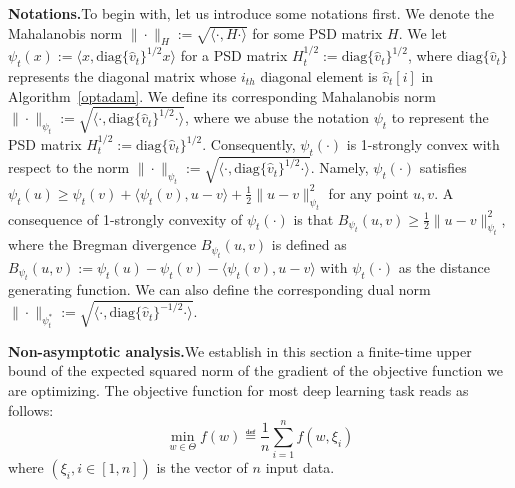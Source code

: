 \documentclass[11pt]{article}
\theoremstyle{k}
\begin{document}
\textbf{Notations.}\hspace{0.1in}To begin with, let us introduce some notations first.
We denote the Mahalanobis norm $\|\cdot\|_H := \sqrt{ \langle \cdot, H \cdot \rangle }$ for some PSD matrix $H$.
We let $\psi_t(x) := \langle x, \text{diag}\{\hat{v}_t\}^{1/2} x \rangle$ for a PSD matrix $H_t^{1/2}:= \text{diag}\{\hat{v}_t\}^{1/2}$, 
where $\text{diag}\{\hat{v}_t\}$ represents the diagonal matrix whose $i_{th}$ diagonal element is $\hat{v}_t[i]$ in Algorithm~\ref{optadam}.
We define its corresponding Mahalanobis norm $\| \cdot \|_{\psi_t}:= 
\sqrt{ \langle \cdot, \text{diag}\{\hat{v}_t\}^{1/2} \cdot \rangle }$,
where we abuse the notation $\psi_t$ to represent the PSD matrix $H_t^{1/2}:=\text{diag}\{\hat{v}_t\}^{1/2}$.
Consequently,
$\psi_t(\cdot)$ is 1-strongly convex with respect to the norm $\| \cdot \|_{\psi_t}:= 
\sqrt{ \langle \cdot, \text{diag}\{\hat{v}_t\}^{1/2} \cdot \rangle }$.
Namely, $\psi_t(\cdot)$ satisfies
$\psi_t(u) \geq \psi_t(v) + \langle \psi_t(v), u - v \rangle + \frac{1}{2} \| u - v\|^2_{\psi_t}$
for any point $u,v$.
A consequence of 1-strongly convexity of $\psi_t(\cdot)$ is that
$B_{\psi_t}(u,v) \geq \frac{1}{2} \| u - v \|^2_{\psi_t}$,
where the Bregman divergence $B_{\psi_t}(u,v)$ is defined as 
$B_{\psi_t}(u,v) := \psi_t(u)
- \psi_t(v) - \langle \psi_t(v), u - v \rangle
$ with $\psi_t(\cdot)$ as the distance generating function.
We can also define the corresponding dual norm $\| \cdot \|_{\psi_t^*}:= \sqrt{ \langle \cdot, \text{diag}\{\hat{v}_t\}^{-1/2} \cdot \rangle }$.

\textbf{Non-asymptotic analysis.}\hspace{0.1in}We establish in this section a finite-time upper bound of the expected squared norm of the gradient of the objective function we are optimizing.
The objective function for most deep learning task reads as follows:
\begin{equation}\label{eq:minproblem}
\min \limits_{w \in \Theta} f(w) \eqdef  \frac{1}{n} \sum_{i=1}^n f(w, \xi_i)
\end{equation}
where $(\xi_i, i \in [1,n])$ is the vector of $n$ input data.
\end{document}
